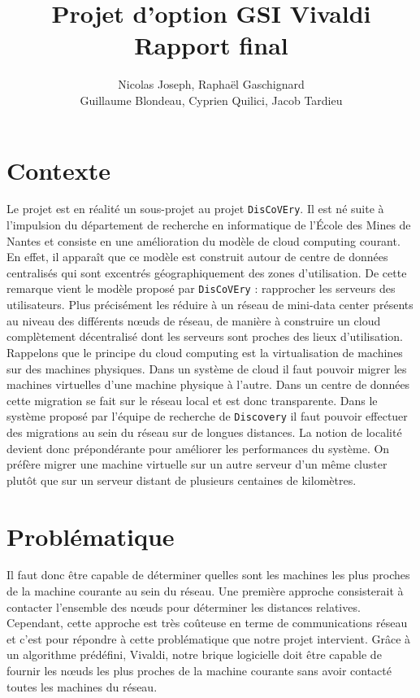 \documentclass[11pt,a4paper]{article}
\title{Projet d'option GSI Vivaldi \\ Rapport final}
\author{Nicolas Joseph, Raphaël Gaschignard\\ Guillaume Blondeau, Cyprien Quilici, Jacob Tardieu}
\begin{document}
\maketitle
\section{Contexte}

Le projet est en réalité un sous-projet au projet \texttt{DisCoVEry}. Il est né suite à l'impulsion du département de recherche en informatique de l'École des Mines de Nantes et consiste en une amélioration du modèle de cloud computing courant. En effet, il apparaît que ce modèle est construit autour de centre de données centralisés qui sont excentrés géographiquement des zones d’utilisation. De cette remarque vient  le modèle proposé par \texttt{DisCoVEry} : rapprocher les serveurs des utilisateurs. Plus précisément les réduire à un réseau de mini-data center présents au niveau des différents n\oe uds de réseau, de manière à construire un cloud complètement décentralisé dont les serveurs sont proches des lieux d'utilisation.\\

Rappelons que le principe du cloud computing est la virtualisation de machines sur des machines physiques. Dans un système de cloud il faut pouvoir migrer les machines virtuelles d'une machine physique à l'autre. Dans un centre de données cette migration se fait sur le réseau local et est donc transparente. Dans le système proposé par l'équipe de recherche de \texttt{Discovery} il faut pouvoir effectuer des migrations au sein du réseau sur de longues distances. La notion de localité devient donc prépondérante pour améliorer les performances du système. On préfère migrer une machine virtuelle sur un autre serveur d'un même cluster plutôt que sur un serveur distant de plusieurs centaines de kilomètres. 

\section{Problématique}
Il faut donc être capable de déterminer quelles sont les machines les plus proches de la machine courante au sein du réseau. Une première approche consisterait à contacter l'ensemble des n\oe uds pour déterminer les distances relatives. Cependant, cette approche est très coûteuse en terme de communications réseau et c'est pour répondre à cette problématique que notre projet intervient. Grâce à un algorithme prédéfini, Vivaldi, notre brique logicielle doit être capable de fournir les n\oe uds les plus proches de la machine courante sans avoir contacté toutes les machines du réseau.\\
\end{document}
